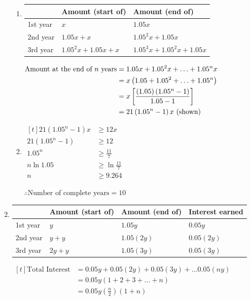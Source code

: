 \documentclass[11pt,a4paper]{book}
\begin{document}
\begin{example}
\begin{enumerate}[label=(\alph*)]
\begin{enumerate}[label=(\roman*)]
\item \setlength{\extrarowheight}{2pt}%
\begin{tabular}[t]{|>{\centering}p{3cm}|>{\centering}p{4.5cm}|>{\centering}p{4.5cm}|}
\hline
 & Amount (start of) & Amount (end of)\tabularnewline
\hline
1st year & $x$ & $1.05x$\tabularnewline
\hline
2nd year & $1.05x+x$ & $1.05^{2}x+1.05x$\tabularnewline
\hline
3rd year & $1.05^{2}x+1.05x+x$ & $1.05^{3}x+1.05^{2}x+1.05x$\tabularnewline
\hline
\end{tabular}

$
\begin{aligned}[t]
\text{Amount at the end of \ensuremath{n} years} & =1.05x+1.05^{2}x+\ldots+1.05^{n}x\\
 & =x\left(1.05+1.05^{2}+\ldots+1.05^{n}\right)\\
 & =x\left[\frac{\left(1.05\right)\left(1.05^{n}-1\right)}{1.05-1}\right]\\
 & =21\left(1.05^{n}-1\right)x\text{ (shown)}
\end{aligned}
$

\item
$
\begin{aligned}[t]
21\left(1.05^{n}-1\right)x & \geq12x\\
21\left(1.05^{n}-1\right) & \geq12\\
1.05^{n} & \geq\frac{11}{7}\\
n\ln1.05 & \geq\ln\frac{11}{7}\\
n & \geq9.264
\end{aligned}
$

$\therefore\text{Number of complete years}=10$


\end{enumerate}

\item
\begin{minipage}[t]{0.5\textwidth}
 \setlength{\extrarowheight}{2pt}%
\begin{tabular}[t]{|>{\centering}p{1.5cm}|>{\centering}p{1.4cm}|>{\centering}p{1.5cm}|>{\centering}p{1.5cm}|}
\hline
 & Amount (start of) & Amount (end of) & Interest earned\tabularnewline
\hline
1st year & $y$ & $1.05y$ & $0.05y$\tabularnewline
\hline
2nd year & $y+y$ & $1.05\left(2y\right)$ & $0.05\left(2y\right)$\tabularnewline
\hline
3rd year & $2y+y$ & $1.05\left(3y\right)$ & $0.05\left(3y\right)$\tabularnewline
\hline
\end{tabular}
\end{minipage}
\begin{minipage}[t]{0.45\textwidth}
\vspace{.5cm}
$
\begin{aligned}[t]
\text{Total Interest} & =0.05y+0.05\left(2y\right)+0.05\left(3y\right)+\ldots0.05\left(ny\right)\\
 & =0.05y\left(1+2+3+\ldots+n\right)\\
 & =0.05y\left(\frac{n}{2}\right)\left(1+n\right)
\end{aligned}
$
\end{minipage}


\end{enumerate}
\end{example}
\end{document}
